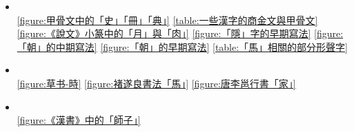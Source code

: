 \begin{itemize}
\begin{itemize}
\begin{spacing}{.5}
            \vspace{2pt}\\
            \tiny
            \cref{figure:說文-艸部}
            \cref{figure:章太炎《駁中國用萬國新語說》「紐文」一頁}
            \cref{figure:《孔子詩論》竹簡片段}
            \cref{figure:徒手刻版}
            \cref{figure:九疊篆陽文印「鷹坊之印」}
            \cref{figure:鳥蟲篆陰文印「大千世界」}
            \cref{figure:《曹全碑》片段}
            \cref{figure:最早的官方簡化字嘗試}
            \cref{figure:一款諾基亞傳統型手機}
            \cref{figure:實體鍵盤標準指法}()
            \cref{figure:由活字字型排成的英文活版}
            \cref{figure:《蘭亭集序》局部}
        \end{spacing}
        \item \begin{spacing}{.5}
            \vspace{2pt}\\
            \tiny
            \cref{figure:甲骨文中的「史」「冊」「典」}
            \cref{table:一些漢字的商金文與甲骨文}
            \cref{figure:《說文》小篆中的「月」與「肉」}
            \cref{figure:「隱」字的早期寫法}
            \cref{figure:「朝」的中期寫法}
            \cref{figure:「朝」的早期寫法}
            \cref{table:「馬」相關的部分形聲字}
            \\
        \end{spacing}
        \item \begin{spacing}{.5}
            \vspace{2pt}\\
            \tiny
            \cref{figure:草书-時}
            \cref{figure:褚遂良書法「馬」}
            \cref{figure:唐李邕行書「家」}
            \\
        \end{spacing}
        \item \begin{spacing}{.5}
            \vspace{2pt}\\
            \tiny
            \cref{figure:《漢書》中的「師子」}

\end{spacing}
\end{itemize}
\end{itemize}
